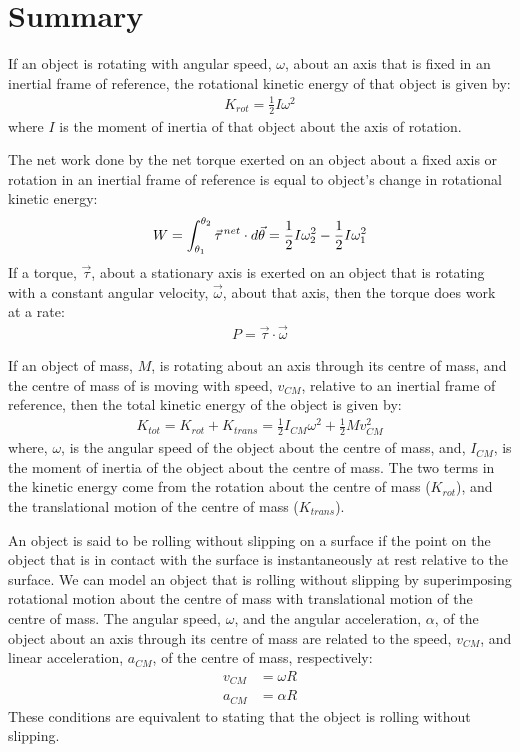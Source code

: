 \newpage
\section{Summary}
\vspace{-0.10cm}
\begin{chapterSummary}
If an object is rotating with angular speed, $\omega$, about an axis that is fixed in an inertial frame of reference, the rotational kinetic energy of that object is given by:
\begin{align*}
K_{rot} = \frac{1}{2}I\omega^2
\end{align*}
where $I$ is the moment of inertia of that object about the axis of rotation.

The net work done by the net torque exerted on an object about a fixed axis or rotation in an inertial frame of reference is equal to object's change in rotational kinetic energy:
\begin{align*}
W = \int_{\theta_1}^{\theta_2}\pvec \tau^{net}\cdot d\vec \theta = \frac{1}{2}I\omega_2^2 -\frac{1}{2}I\omega_1^2
\end{align*}
If a torque, $\vec \tau$, about a stationary axis is exerted on an object that is rotating with a constant angular velocity, $\vec \omega$, about that axis, then the torque does work at a rate:
\begin{align*}
P = \vec \tau \cdot \vec \omega
\end{align*}

If an object of mass, $M$, is rotating about an axis through its centre of mass, and the centre of mass of is moving with speed, $v_{CM}$, relative to an inertial frame of reference, then the total kinetic energy of the object is given by:
\begin{align*}
K_{tot} = K_{rot} + K_{trans} = \frac{1}{2}I_{CM}\omega^2+ \frac{1}{2}Mv_{CM}^2
\end{align*}
where, $\omega$, is the angular speed of the object about the centre of mass, and, $I_{CM}$, is the moment of inertia of the object about the centre of mass. The two terms in the kinetic energy come from the rotation about the centre of mass ($K_{rot}$), and the translational motion of the centre of mass ($K_{trans}$).

An object is said to be rolling without slipping on a surface if the point on the object that is in contact with the surface is instantaneously at rest relative to the surface. We can model an object that is rolling without slipping by superimposing rotational motion about the centre of mass with translational motion of the centre of mass. The angular speed, $\omega$, and the angular acceleration, $\alpha$, of the object about an axis through its centre of mass are related to the speed, $v_{CM}$, and linear acceleration, $a_{CM}$, of the centre of mass, respectively:
\begin{align*}
v_{CM} &= \omega R\\
a_{CM} &= \alpha R
\end{align*}
These conditions are equivalent to stating that the object is rolling without slipping.


\end{chapterSummary}
